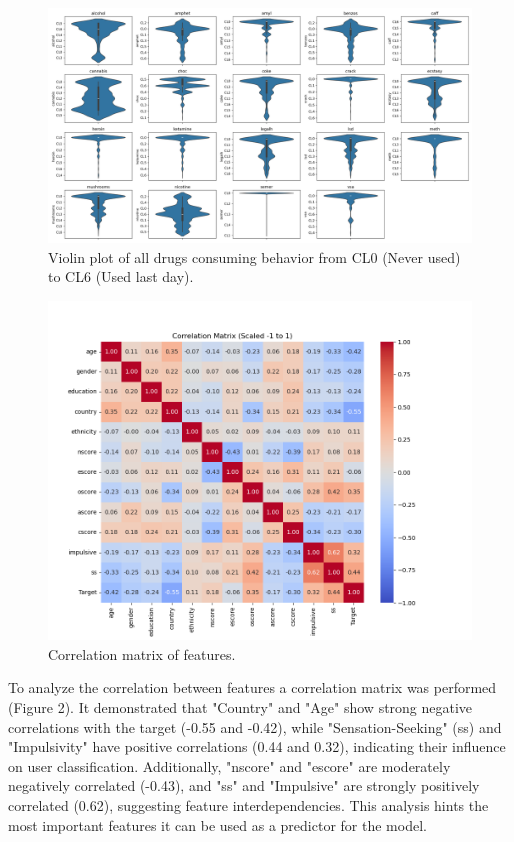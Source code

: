 \documentclass{article}
\begin{document}
\begin{figure}[h!]
    \centering
    \includegraphics[width=\textwidth]{violin_plots_all_columns.png}
    \caption{Violin plot of all drugs consuming behavior from CL0 (Never used) to CL6 (Used last day).}
    \label{fig:violin_plot}
\end{figure}

\begin{figure}[h!]
    \centering
    \includegraphics[width=\textwidth]{correlation-matrixpng.png}
    \caption{Correlation matrix of features.}
    \label{fig:correlation-matrix}
\end{figure}

To analyze the correlation between features a correlation matrix was performed (Figure 2). It demonstrated that "Country" and "Age" show strong negative correlations with the target (-0.55 and -0.42), while "Sensation-Seeking" (ss) and "Impulsivity" have positive correlations (0.44 and 0.32), indicating their influence on user classification. Additionally, "nscore" and "escore" are moderately negatively correlated (-0.43), and "ss" and "Impulsive" are strongly positively correlated (0.62), suggesting feature interdependencies. This analysis hints the most important features it can be used as a predictor for the model.
\end{document}
